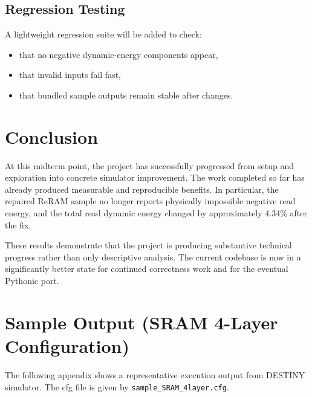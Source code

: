 \documentclass[11pt]{article}
\begin{document}
\subsection{Regression Testing}

A lightweight regression suite will be added to check:

\begin{itemize}[leftmargin=1.5em]
    \item that no negative dynamic-energy components appear,
    \item that invalid inputs fail fast,
    \item that bundled sample outputs remain stable after changes.
\end{itemize}



\section{Conclusion}

At this midterm point, the project has successfully progressed from setup and exploration into concrete simulator improvement. The work completed so far has already produced measurable and reproducible benefits. In particular, the repaired ReRAM sample no longer reports physically impossible negative read energy, and the total read dynamic energy changed by approximately 4.34\% after the fix.

These results demonstrate that the project is producing substantive technical progress rather than only descriptive analysis. The current codebase is now in a significantly better state for continued correctness work and for the eventual Pythonic port.


\appendix
\section{Sample Output (SRAM 4-Layer Configuration)}

The following appendix shows a representative execution output from DESTINY simulator. The cfg file is given by \texttt{sample\_SRAM\_4layer.cfg}.
\end{document}
